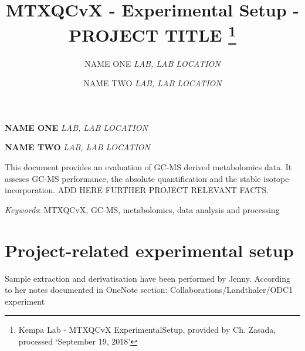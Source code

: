 \documentclass[10pt,]{article}
\title{MTXQCvX - Experimental Setup - PROJECT TITLE \thanks{Kempa Lab - MTXQCvX ExperimentalSetup, provided by Ch. Zasada, processed
`September 19, 2018'}  }
\author{\Large NAME ONE\vspace{0.05in} \newline\normalsize\emph{LAB, LAB LOCATION}   \and \Large NAME TWO\vspace{0.05in} \newline\normalsize\emph{LAB, LAB LOCATION}  }
\date{}
\newcommand*{\authorfont}{\fontfamily{phv}\selectfont}
\renewenvironment{abstract}
 {{%
    \setlength{\leftmargin}{0mm}
    \setlength{\rightmargin}{\leftmargin}%
  }%
  \relax}
 {\endlist}
\begin{document}
	
%

{%
\setlength{\parindent}{0pt}
\thispagestyle{plain}
{\fontsize{18}{20}\selectfont\raggedright 
\maketitle  %

}

{
   \vskip 13.5pt\relax \normalsize\fontsize{11}{12} 
\textbf{\authorfont NAME ONE} \hskip 15pt \emph{\small LAB, LAB LOCATION}   \par \textbf{\authorfont NAME TWO} \hskip 15pt \emph{\small LAB, LAB LOCATION}   

}

}



{
\hypersetup{linkcolor=black}
\setcounter{tocdepth}{2}
\tableofcontents
}




\begin{abstract}

    \hbox{\vrule height .2pt width 39.14pc}

    \vskip 8.5pt %

\noindent This document provides an evaluation of GC-MS derived metabolomics data.
It asseses GC-MS performance, the absolute quantification and the stable
isotope incorporation. ADD HERE FURTHER PROJECT RELEVANT FACTS.


\vskip 8.5pt \noindent \emph{Keywords}: MTXQCvX, GC-MS, metabolomics, data analysis and processing \par

    \hbox{\vrule height .2pt width 39.14pc}



\end{abstract}


\vskip 6.5pt

\noindent  \section{Project-related experimental
setup}\label{project-related-experimental-setup}

Sample extraction and derivatisation have been performed by Jenny.
According to her notes documented in OneNote section:
Collaborations/Landthaler/ODC1 experiment
\end{document}
